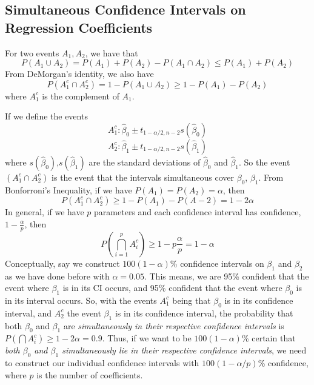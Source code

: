 \subsection{Simultaneous Confidence Intervals on Regression Coefficients}
\begin{theorem}
    For two events $A_1, A_2$, we have that 
    \[P(A_1 \cup A_2) = P(A_1) + P(A_2) - P(A_1 \cap A_2) \leq P(A_1) + P(A_2)\]
    From DeMorgan's identity, we also have 
    \[P(A_1^c \cap A_2^c) = 1 - P(A_1 \cup A_2) \geq 1 - P(A_1) - P(A_2)\]
    where $A_1^c$ is the complement of $A_1$.
\end{theorem}
\noindent
If we define the events 
\[A_1^c: \hat{\beta}_0 \pm t_{1-\alpha/2, n-2}s(\hat{\beta}_0)\]
\[A_2^c: \hat{\beta}_1 \pm t_{1-\alpha/2, n-2}s(\hat{\beta}_1)\]
where $s(\hat{\beta}_0)$,$s(\hat{\beta}_1)$ are the standard deviations of $\hat{\beta}_0$ and $\hat{\beta}_1$. So the event $(A_1^c \cap A_2^c)$ is the event that the intervals simultaneous cover $\beta_0$, $\beta_1$. From Bonforroni's Inequality, if we have $P(A_1) = P(A_2) = \alpha$, then 
\[P(A_1^c \cap A_2^c) \geq 1 - P(A_1) - P(A-2) = 1 - 2\alpha\]
In general, if we have $p$ parameters and each confidence interval has confidence, $1- \frac{\alpha}{p}$, then 
\[P\left(\bigcap_{i=1}^p A_i^c\right) \geq 1 - p\frac{\alpha}{p} = 1 - \alpha\]
Conceptually, say we construct $100(1-\alpha)$\% confidence intervals on $\beta_1$ and $\beta_2$ as we have done before with $\alpha = 0.05$. This means, we are 95\% confident that the event where $\beta_1$ is in its CI occurs, and 95\% confident that the event where $\beta_0$ is in its interval occurs. So, with the events $A_1^c$ being that $\beta_0$ is in its confidence interval, and $A_2^c$ the event $\beta_1$ is in its confidence interval, the probability that both $\beta_0$ and $\beta_1$ are \textit{simultaneously in their respective confidence intervals} is $P(\bigcap A_i^{c}) \geq 1 - 2\alpha = 0.9$. Thus, if we want to be $100(1-\alpha)$\% certain that \textit{both $\beta_0$ and $\beta_1$ simultaneously lie in their respective confidence intervals}, we need to construct our individual confidence intervals with $100(1 - \alpha/p)$\% confidence, where $p$ is the number of coefficients.
